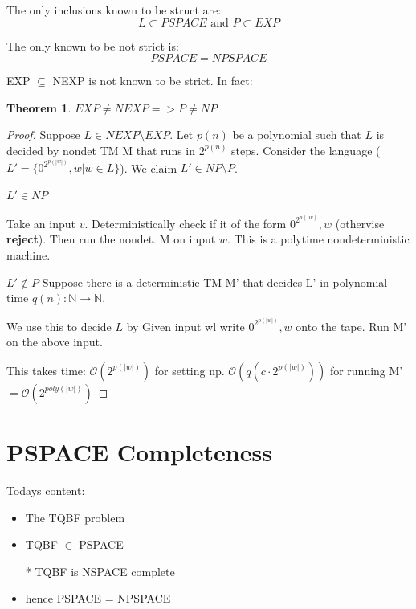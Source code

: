 \documentclass[a4paper,12pt]{article}
\theoremstyle{definition}
\newtheorem{theorem}[counter]{Theorem}
\theoremstyle{remark}
\newcommand{\N}{\mathbb{N}}
\begin{document}
The only inclusions known to be struct are:
\begin{equation*}
    L \subset PSPACE \text{ and } P \subset EXP
\end{equation*}

The only known to be not strict is:
\begin{equation*}
    PSPACE = NPSPACE
\end{equation*}

EXP $\subseteq$ NEXP is not known to be strict. In fact:

\begin{theorem}
    $EXP \neq NEXP => P \neq NP$
\end{theorem}

\begin{proof}
    Suppose $L \in NEXP \setminus EXP$. Let $p(n)$ be a polynomial such that $L$ is decided by nondet TM M that runs in $2^{p(n)}$ steps.
    Consider the language ($L' = \{0^{2^{p(|w|)}}, w | w \in L\}$). We claim $L' \in NP \setminus P$.
    
    $L' \in NP$
    
    Take an input $v$. Deterministically check if it of the form $0^{2^{p(|w)}}, w$ (othervise \textbf{reject}). Then run the nondet.
    M on input $w$. This is a polytime nondeterministic machine.
    
    $L' \notin P$
    Suppose there is a deterministic TM M' that decides L' in polynomial time $q(n): \N \to \N$.
    
    We use this to decide $L$ by Given input wl write $0^{2^{p(|w|)}}, w$ onto the tape. Run M' on the above input.
    
    This takes time: $\mathscr{O}(2^{p(|w|)})$ for setting np. $\mathscr{O}(q(c\cdot2^{p(|w|)}))$ for running M'
    $= \mathscr{O}(2^{poly(|w|)})$
\end{proof}





\newpage
\section{PSPACE Completeness}
Todays content:
\begin{itemize}
    \item The TQBF problem
    \item TQBF $\in$ PSPACE
    \item[*] TQBF is NSPACE complete
    \item hence PSPACE = NPSPACE  
\end{itemize}
\end{document}
